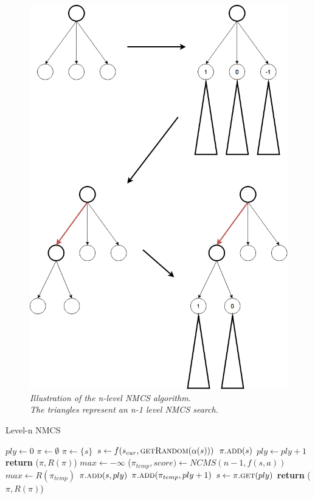 \documentclass[master.tex]{subfiles}
\begin{document}
\begin{figure}[h!]
\centering

\includegraphics[scale=0.25]{images/NMCS.png}

\caption{\emph{Illustration of the n-level NMCS algorithm. \\The triangles represent an n-1 level NMCS search.}}
\label{fig:nmcs}
\end{figure}

\begin{algorithm}
\caption{Level-n NMCS}
\label{alg:ncms}
\begin{algorithmic}[1]
\State $ply \gets 0$
\State $\pi \gets \emptyset$
	\State $\pi \gets \{s \}$
		\State $s \gets f(s_{cur}, \textsc{getRandom}(\alpha(s)))$
		\State $\pi.\textsc{add}(s)$
		\State $ply \gets ply + 1$
	\EndWhile
	\State \textbf{return} ($\pi, R(\pi)$)
\Else
	\State $max \gets -\infty$
			\State ($\pi_{temp}, score) \gets NCMS(n - 1,  f(s, a))$
				\State $max \gets R(\pi_{temp})$
				\State $\pi.\textsc{add}(s, ply)$
				\State $\pi.\textsc{add}(\pi_{temp}, ply + 1)$
			\EndIf
		\EndFor
		\State $s \gets \pi.\textsc{get}(ply)$
	\EndWhile
	\State \textbf{return} ($\pi, R(\pi)$)
\EndIf
\EndProcedure
\end{algorithmic}
\end{algorithm}
\end{document}

